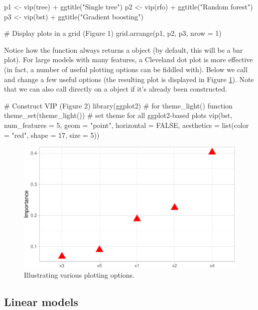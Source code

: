 \begin{Schunk}
\begin{Sinput}
p1 <- vip(tree) + ggtitle("Single tree")
p2 <- vip(rfo) + ggtitle("Random forest")
p3 <- vip(bst) + ggtitle("Gradient boosting")

# Display plots in a grid (Figure 1)
grid.arrange(p1, p2, p3, nrow = 1)
\end{Sinput}
\end{Schunk}

Notice how the  function always returns a 
object (by default, this will be a bar plot). For large models with many
features, a Cleveland dot plot is more effective (in fact, a number of
useful plotting options can be fiddled with). Below we call 
and change a few useful options (the resulting plot is displayed in
Figure \ref{fig:dot-plot}). Note that we can also call 
directly on a  object if it's already been constructed.

\begin{Schunk}
\begin{Sinput}
# Construct VIP (Figure 2)
library(ggplot2)  # for theme_light() function
theme_set(theme_light())  # set theme for all ggplot2-based plots
vip(bst, num_features = 5, geom = "point", horizontal = FALSE, 
    aesthetics = list(color = "red", shape = 17, size = 5)) 
\end{Sinput}
\begin{figure}[!htb]

{\centering \includegraphics[width=0.7\linewidth]{greenwell-boehmke_files/figure-latex/dot-plot-1} 

}

\caption[Illustrating various plotting options]{Illustrating various plotting options.}\label{fig:dot-plot}
\end{figure}
\end{Schunk}

\hypertarget{linear-models}{%
\subsection{Linear models}\label{linear-models}}

